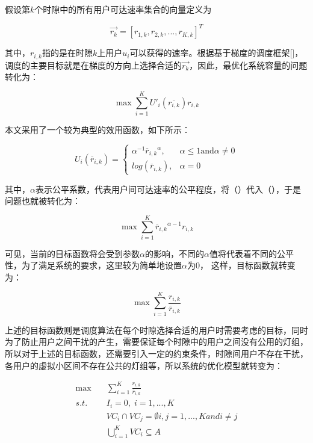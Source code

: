 假设第$k$个时隙中的所有用户可达速率集合的向量定义为

\begin{equation}
    \overrightarrow {{r_k}}  = {[{r_{1,k}},{r_{2,k}},...,{r_{K,k}}]^T}
\end{equation}

其中，$r_{i,k}$指的是在时隙$k$上用户$u_{i}$可以获得的速率。根据基于梯度的调度框架[]，调度的主要目标就是在梯度的方向上选择合适的$\overrightarrow {{r_k}}$，因此，最优化系统容量的问题转化为：

\begin{equation}
    \max \sum\limits_{i = 1}^K {{{U'}_i}(\overline {{r_{i,k}}} )} {r_{i,k}}
\end{equation}

本文采用了一个较为典型的效用函数，如下所示：

\begin{equation}
    {U_i}(\overline {r}_{i,k}) =
    \begin{cases}
        \alpha^{-1} {\overline {r}_{i,k}}^\alpha ,  & \alpha \le 1 \mbox{and} \alpha \ne 0 \\
        log(\overline {r}_{i,k}),                   & \alpha = 0
    \end{cases}
\end{equation}

其中，$\alpha$表示公平系数，代表用户间可达速率的公平程度，将（）代入（），于是问题也就被转化为：

\begin{equation}
    \max \sum\limits_{i = 1}^K {{{\overline {r}_{i,k} }^{\alpha  - 1}}{r_{i,k}}}
\end{equation}

可见，当前的目标函数将会受到参数$\alpha$的影响，不同的$\alpha$值将代表着不同的公平性，为了满足系统的要求，这里较为简单地设置$\alpha$为0，
这样，目标函数就转变为：

\begin{equation}
    \max \sum\limits_{i = 1}^K {\frac{{{r_{i,k}}}}{{\overline {r}_{i,k} }}}
\end{equation}

上述的目标函数则是调度算法在每个时隙选择合适的用户时需要考虑的目标，同时为了防止用户之间干扰的产生，需要保证每个时隙中的用户之间没有公用的灯组，
所以对于上述的目标函数，还需要引入一定的约束条件，时隙间用户不存在干扰，各用户的虚拟小区间不存在公共的灯组等，所以系统的优化模型就转变为：

\begin{equation}
\begin{aligned}
    \max\quad & \sum_{i=1}^{K}\frac{r_{i,k}}{\overline{r}_{i,k}} \\
    s.t. \quad & I_{i} = 0,\; i=1,...,K \\
        & VC_{i} \cap VC_{j} = \emptyset  i,j= 1,...,K and i \ne j  \\
        & \bigcup_{i = 1}^K V{C_i} \subseteq A
\end{aligned}
\end{equation}

